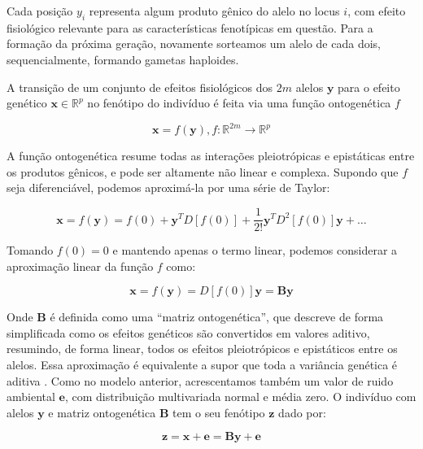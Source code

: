 Cada posição $y_i$ representa algum produto gênico do alelo no
locus $i$, com efeito fisiológico relevante para as características
fenotípicas em questão.
Para a formação da próxima geração, novamente sorteamos um alelo de cada
dois, sequencialmente, formando gametas haploides.

A transição de um conjunto de efeitos fisiológicos dos $2m$ alelos
$\mathbf{y}$ para o efeito genético $\mathbf{x} \in \mathbb{R}^p$  no
fenótipo do indivíduo é feita via uma função ontogenética $f$

\begin{equation}
    \mathbf{x} = f(\mathbf{y}), f:\mathbb{R}^{2m} \rightarrow \mathbb{R}^{p}
\end{equation}

A função ontogenética resume todas as interações pleiotrópicas e
epistáticas entre os produtos gênicos, e pode ser altamente não linear e complexa.
Supondo que $f$ seja diferenciável, podemos aproximá-la por uma série de
Taylor:

\begin{equation}
\mathbf{x} = f(\mathbf{y}) = f(0) + \mathbf{y}^T D[f(0)] + \frac{1}{2!} \mathbf{y}^T D^2 [f(0)] \mathbf{y} + \ldots
\end{equation}

Tomando $f(0) = 0$ e mantendo apenas o termo linear, podemos considerar
a aproximação linear da função $f$ como:

\begin{equation}
    \mathbf{x} = f(\mathbf{y}) = D[f(0)]\mathbf{y} = \mathbf{B}\mathbf{y}
\label{matrizB}
\end{equation}

Onde $\mathbf{B}$ é definida como uma ``matriz ontogenética'', que descreve de
forma simplificada como os efeitos genéticos são convertidos em 
valores aditivo, resumindo, de forma linear, todos os efeitos pleiotrópicos e
epistáticos entre os alelos.
Essa aproximação é equivalente a supor que toda a variância genética é aditiva \citep{Wagner1989}.
Como no modelo anterior, acrescentamos também um valor de ruido
ambiental $\mathbf{e}$, com distribuição multivariada normal e média zero.
O indivíduo com alelos $\mathbf{y}$ e matriz ontogenética $\mathbf{B}$
tem o seu fenótipo $\mathbf{z}$ dado por:

\begin{equation}
    \mathbf{z} = \mathbf{x} + \mathbf{e} = \mathbf{By} + \mathbf{e}
\end{equation}

